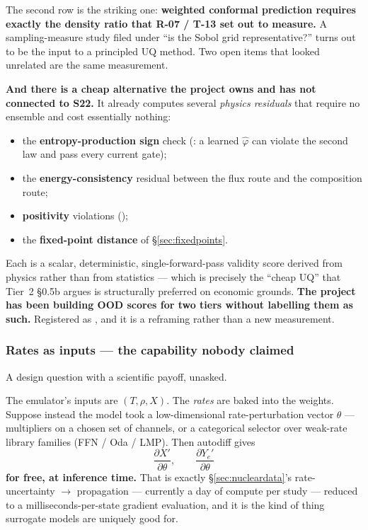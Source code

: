 The second row is the striking one: \textbf{weighted conformal prediction
requires exactly the density ratio that R-07 / T-13 set out to measure.} A
sampling-measure study filed under ``is the Sobol grid representative?'' turns
out to be the input to a principled UQ method. Two open items that looked
unrelated are the same measurement.

\textbf{And there is a cheap alternative the project owns and has not connected
to S22.} It already computes several \emph{physics residuals} that require no
ensemble and cost essentially nothing:

\begin{itemize}
\item the \textbf{entropy-production sign} check (: a
  learned $\hat\varphi$ can violate the second law and pass every current
  gate);
\item the \textbf{energy-consistency} residual between the flux route and the
  composition route;
\item \textbf{positivity} violations ();
\item the \textbf{fixed-point distance} of \S\ref{sec:fixedpoints}.
\end{itemize}

Each is a scalar, deterministic, single-forward-pass validity score derived from
physics rather than from statistics --- which is precisely the ``cheap UQ'' that
Tier~2 \S 0.5b argues is structurally preferred on economic grounds. \textbf{The
project has been building OOD scores for two tiers without labelling them as
such.} Registered as , and it is a reframing rather than a new
measurement.

\subsubsection{Rates as inputs --- the capability nobody claimed}
\label{sec:ratesinputs}

A design question with a scientific payoff, unasked.

The emulator's inputs are $(T, \rho, X)$. The \emph{rates} are baked into the
weights. Suppose instead the model took a low-dimensional rate-perturbation
vector $\theta$ --- multipliers on a chosen set of channels, or a categorical
selector over weak-rate library families (FFN / Oda / LMP). Then autodiff gives
%
\begin{equation}
\label{eq:ratederiv}
\frac{\partial X'}{\partial \theta}, \qquad \frac{\partial Y_e'}{\partial \theta}
\end{equation}
%
\textbf{for free, at inference time.} That is exactly \S\ref{sec:nucleardata}'s
rate-uncertainty $\to$ \Ye{} propagation --- currently a day of compute per
study --- reduced to a milliseconds-per-state gradient evaluation, and it is the
kind of thing surrogate models are uniquely good for.

